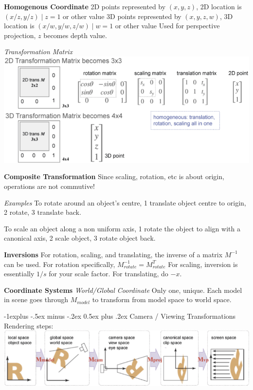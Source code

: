 \documentclass[letterpaper, 8pt]{extarticle}
\makeatletter
\renewcommand{\section}{\@startsection{section}{1}{0mm}%
                                {-1explus -.5ex minus -.2ex}%
                                {0.5ex plus .2ex}%
                                {\normalfont\normalsize\bfseries}}
\makeatother
\begin{document}
\begin{multicols*}{4}
\textbf{Homogenous Coordinate}
2D points represented by \((x, y, z)\), 2D location is \((x/z, y/z) \mid z=1\) or other value
3D points represented by \((x, y, z, w)\), 3D location is \((x/w, y/w, z/w) \mid w=1\) or other value
Used for perspective projection, \(z\) becomes depth value.

\textit{Transformation Matrix}
\includegraphics[width=\linewidth]{homogenous-coord-transformation-matrix.png}

\textbf{Composite Transformation}
Since scaling, rotation, etc is about origin, operations are not commutive!

\textit{Examples}
To rotate around an object's centre, 1 translate object centre to origin, 2 rotate, 3 translate back.

To scale an object along a non uniform axis, 1 rotate the object to align with a canonical axis, 2 scale object, 3 rotate object back.

\textbf{Inversions}
For rotation, scaling, and translating,
the inverse of a matrix \(M^{-1}\) can be used.
For rotation specifically, \(M^{-1}_{rotate}=M^T_{rotate}\)
For scaling, inversion is essentially \(1/s\) for your scale factor.
For translating, do \(-x\).

\textbf{Coordinate Systems}
\textit{World/Global Coordinate}
Only one, unique.
Each model in scene goes through \(M_{model}\) to transform from model space to world space.

\section{Camera / Viewing Transformations}
Rendering steps:
\includegraphics[width=\linewidth]{rendering-steps.png}


\end{multicols*}
\end{document}
